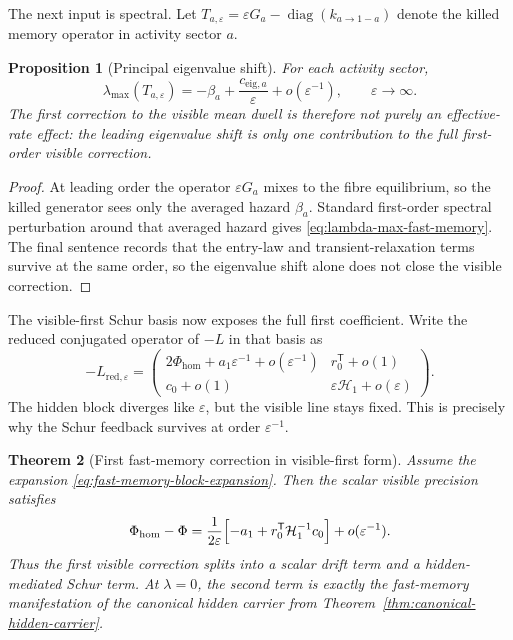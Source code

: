 \documentclass[11pt]{article}
\numberwithin{equation}{section}
\DeclareMathOperator{\diag}{diag}
\newcommand{\eps}{\varepsilon}
\theoremstyle{thmcompact}
\newtheorem{theorem}{Theorem}[section]
\newtheorem{proposition}[theorem]{Proposition}
\theoremstyle{remark}
\begin{document}
The next input is spectral. Let $T_{a,\eps}=\eps G_a-\diag(k_{a\to 1-a})$ denote the killed memory operator in activity sector $a$.

\begin{proposition}[Principal eigenvalue shift]\label{prop:fast-memory-eigenvalue}
For each activity sector,
\begin{equation}\label{eq:lambda-max-fast-memory}
\lambda_{\max}(T_{a,\eps})=-\beta_a+\frac{c_{\mathrm{eig},a}}{\eps}+o(\eps^{-1}),
\qquad \eps\to\infty.
\end{equation}
The first correction to the visible mean dwell is therefore not purely an effective-rate effect: the leading eigenvalue shift is only one contribution to the full first-order visible correction.
\end{proposition}

\begin{proof}
At leading order the operator $\eps G_a$ mixes to the fibre equilibrium, so the killed generator sees only the averaged hazard $\beta_a$. Standard first-order spectral perturbation around that averaged hazard gives \eqref{eq:lambda-max-fast-memory}. The final sentence records that the entry-law and transient-relaxation terms survive at the same order, so the eigenvalue shift alone does not close the visible correction.
\end{proof}

The visible-first Schur basis now exposes the full first coefficient. Write the reduced conjugated operator of $-L$ in that basis as
\begin{equation}\label{eq:fast-memory-block-expansion}
-L_{\mathrm{red},\eps}=
\begin{pmatrix}
2\Phi_{\mathrm{hom}}+a_1\eps^{-1}+o(\eps^{-1}) & r_0^{\mathsf T}+o(1)\\
c_0+o(1) & \eps\mathcal H_1+o(\eps)
\end{pmatrix}.
\end{equation}
The hidden block diverges like $\eps$, but the visible line stays fixed. This is precisely why the Schur feedback survives at order $\eps^{-1}$.

\begin{theorem}[First fast-memory correction in visible-first form]\label{thm:fast-memory-first-correction}
Assume the expansion \eqref{eq:fast-memory-block-expansion}. Then the scalar visible precision satisfies
\begin{equation}\label{eq:phi-first-correction}
\Phi_{\mathrm{hom}}-\Phi
=
\frac{1}{2\eps}\Bigl[-a_1+r_0^{\mathsf T}\mathcal H_1^{-1}c_0\Bigr]+o(\eps^{-1}).
\end{equation}
Thus the first visible correction splits into a scalar drift term and a hidden-mediated Schur term. At $\lambda=0$, the second term is exactly the fast-memory manifestation of the canonical hidden carrier from Theorem~\ref{thm:canonical-hidden-carrier}.
\end{theorem}
\end{document}
